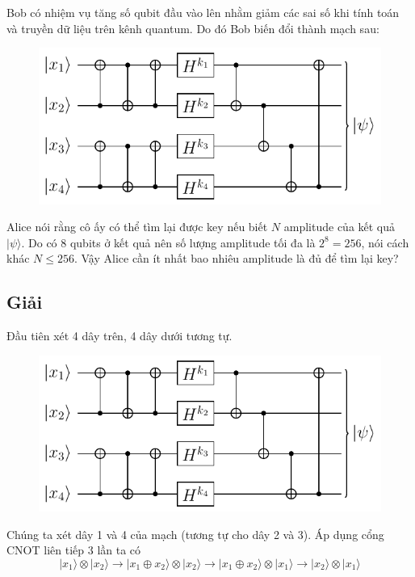 Bob có nhiệm vụ tăng số qubit đầu vào lên nhằm giảm các sai số khi tính toán và truyền dữ liệu trên kênh quantum. Do đó Bob biến đổi thành mạch sau:

\begin{figure}[ht]
    \centering
    \includegraphics[page=2]{nsucrypto/2023/problem10_figures.pdf}
\end{figure}
Alice nói rằng cô ấy có thể tìm lại được key nếu biết $N$ amplitude của kết quả $\lvert \psi \rangle$. Do có 8 qubits ở kết quả nên số lượng amplitude tối đa là $2^8 = 256$, nói cách khác $N \leqslant 256$. Vậy Alice cần ít nhất bao nhiêu amplitude là đủ để tìm lại key?

\subsection*{Giải}

Đầu tiên xét 4 dây trên, 4 dây dưới tương tự.

\begin{figure}[ht]
    \centering
    \includegraphics[page=3]{nsucrypto/2023/problem10_figures.pdf}
\end{figure}
Chúng ta xét dây 1 và 4 của mạch (tương tự cho dây 2 và 3). Áp dụng cổng CNOT liên tiếp 3 lần ta có
\begin{equation*}
    \lvert x_1 \rangle \otimes \lvert x_2 \rangle \to \lvert x_1 \oplus x_2 \rangle \otimes \lvert x_2 \rangle \to \lvert x_1 \oplus x_2 \rangle \otimes \lvert x_1 \rangle \to \lvert x_2 \rangle \otimes \lvert x_1 \rangle
\end{equation*}

